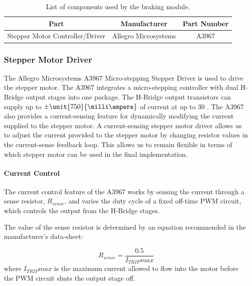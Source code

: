 \begin{table}
  \caption{List of components used by the braking module.}
  \centering
  \begin{tabular}{|c|c|c|}
    \hline 
    Part & Manufacturer & Part Number\tabularnewline 
    \hline \hline
    Stepper Motor Controller/Driver & Allegro Microsystems & A3967 \tabularnewline
    \hline
  \end{tabular}
  \label{table:braking_module_components}
\end{table}

\subsubsection{Stepper Motor Driver}

The Allegro Microsystems A3967 Micro-stepping Stepper Driver is used to drive the stepper motor. The A3967 integrates a micro-stepping controller with dual H-Bridge output stages into one package. The H-Bridge output transistors can supply up to $\pm\unit{750}{\milli\ampere}$ of current at up to \unit{30}{\volt} \cite{A3967}. The A3967 also provides a current-sensing feature for dynamically modifying the current supplied to the stepper motor. A current-sensing stepper motor driver allows us to adjust the current provided to the stepper motor by changing resistor values in the current-sense feedback loop. This allows us to remain flexible in terms of which stepper motor can be used in the final implementation.

\paragraph{Current Control}


The current control feature of the A3967 works by sensing the current through a sense resistor, $R_{sense}$, and varies the duty cycle of a fixed off-time PWM circuit, which controls the output from the H-Bridge stages.

The value of the sense resistor is determined by an equation recommended in the manufacturer's data-sheet:

\begin{equation}
R_{sense}=\frac{0.5}{I_{TRIP}max}
\end{equation}
where $I_{TRIP}max$ is the maximum current allowed to flow into the motor before the PWM circuit shuts the output stage off.

